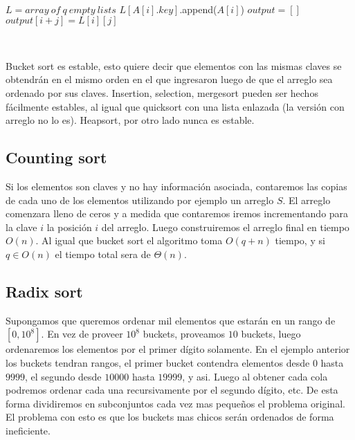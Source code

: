 ~

\begin{algorithmic}[1]
    \State $L = array\ of\ q\ empty\ lists$ 
     
      \State $L[A[i].key]$.append($A[i]$)
    \EndFor
    \State $output = []$
     
       
	\State $output[i+j] = L[i][j]$
      \EndFor
    \EndFor
 \EndFunction
\end{algorithmic}

~

Bucket sort es estable, esto quiere decir que elementos con las mismas claves se obtendr\'an en el mismo orden en el que ingresaron luego de que el arreglo sea ordenado por sus claves. Insertion, selection, mergesort pueden ser hechos f\'acilmente estables, al igual que quicksort con una lista enlazada (la versi\'on con arreglo no lo es). Heapsort, por otro lado nunca es estable.

\subsection{Counting sort}

Si los elementos son claves y no hay informaci\'on asociada, contaremos las copias de cada uno de los elementos utilizando por ejemplo un arreglo $S$. El arreglo comenzara lleno de ceros y a medida que contaremos iremos incrementando para la clave $i$ la posici\'on $i$ del arreglo. Luego construiremos el arreglo final en tiempo $O(n)$. Al igual que bucket sort el algoritmo toma $O(q+n)$ tiempo, y si $q \in O(n)$ el tiempo total sera de $\Theta(n)$.

\subsection{Radix sort}

Supongamos que queremos ordenar mil elementos que estar\'an en un rango de $[0, 10^8]$. En vez de proveer $10^8$ buckets, proveamos $10$ buckets, luego ordenaremos los elementos por el primer d\'igito solamente. En el ejemplo anterior los buckets tendran rangos, el primer bucket  contendra elementos desde $0$ hasta $9999$, el segundo desde $10000$ hasta $19999$, y asi. Luego al obtener cada cola podremos ordenar cada una recursivamente por el segundo d\'igito, etc. De esta forma dividiremos en subconjuntos cada vez mas peque\~nos el problema original. El problema con esto es que los buckets mas chicos ser\'an ordenados de forma ineficiente.


